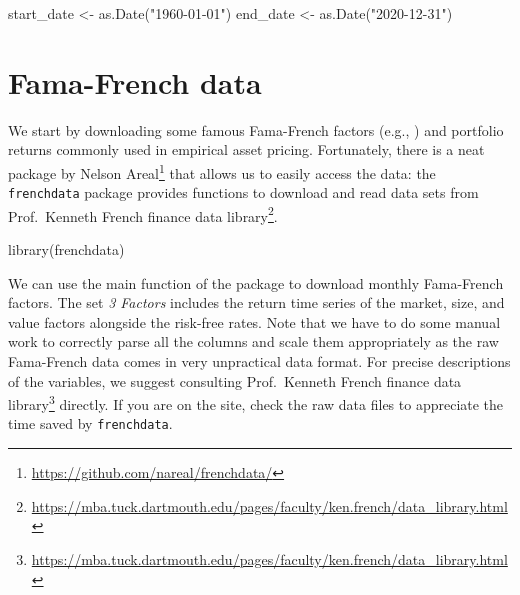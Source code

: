 \documentclass[
]{book}
\newenvironment{Shaded}{\begin{snugshade}}{\end{snugshade}}
\newcommand{\FunctionTok}[1]{\textcolor[rgb]{0,0,0}{#1}}
\newcommand{\NormalTok}[1]{#1}
\newcommand{\OtherTok}[1]{\textcolor[rgb]{0.37,0.37,0.37}{#1}}
\newcommand{\StringTok}[1]{\textcolor[rgb]{0.5,0.5,0.5}{#1}}
\renewcommand{\href}[2]{#2\footnote{\url{#1}}}
\begin{document}
\begin{Shaded}
\begin{Highlighting}[]
\NormalTok{start\_date }\OtherTok{\textless{}{-}} \FunctionTok{as.Date}\NormalTok{(}\StringTok{"1960{-}01{-}01"}\NormalTok{)}
\NormalTok{end\_date }\OtherTok{\textless{}{-}} \FunctionTok{as.Date}\NormalTok{(}\StringTok{"2020{-}12{-}31"}\NormalTok{)}
\end{Highlighting}
\end{Shaded}

\hypertarget{fama-french-data}{%
\section{Fama-French data}\label{fama-french-data}}

We start by downloading some famous Fama-French factors (e.g., \citet{Fama1993}) and portfolio returns commonly used in empirical asset pricing. Fortunately, there is a neat package by \href{https://github.com/nareal/frenchdata/}{Nelson Areal} that allows us to easily access the data: the \texttt{frenchdata} package provides functions to download and read data sets from \href{https://mba.tuck.dartmouth.edu/pages/faculty/ken.french/data_library.html}{Prof.~Kenneth French finance data library}.

\begin{Shaded}
\begin{Highlighting}[]
\FunctionTok{library}\NormalTok{(frenchdata)}
\end{Highlighting}
\end{Shaded}

We can use the main function of the package to download monthly Fama-French factors. The set \emph{3 Factors} includes the return time series of the market, size, and value factors alongside the risk-free rates. Note that we have to do some manual work to correctly parse all the columns and scale them appropriately as the raw Fama-French data comes in very unpractical data format. For precise descriptions of the variables, we suggest consulting \href{https://mba.tuck.dartmouth.edu/pages/faculty/ken.french/data_library.html}{Prof.~Kenneth French finance data library} directly. If you are on the site, check the raw data files to appreciate the time saved by \texttt{frenchdata}.
\end{document}
